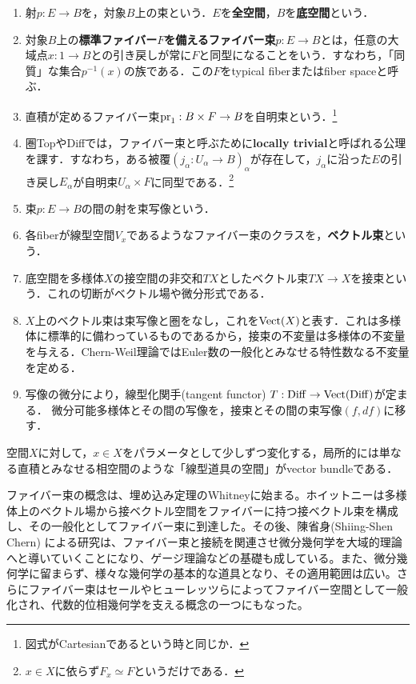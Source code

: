 \documentclass[uplatex,dvipdfmx]{jsreport}
\begin{document}
\begin{definition}\mbox{}
    \begin{enumerate}
        \item 射$p:E\to B$を，対象$B$上の束という．$E$を\textbf{全空間}，$B$を\textbf{底空間}という．
        \item 対象$B$上の\textbf{標準ファイバー$F$を備えるファイバー束}$p:E\to B$とは，任意の大域点$x:1\to B$との引き戻しが常に$F$と同型になることをいう．すなわち，「同質」な集合$p^{-1}(x)$の族である．この$F$をtypical fiberまたはfiber spaceと呼ぶ．
        \item 直積が定めるファイバー束$\mathrm{pr}_1:B\times F\to B$を自明束という．\footnote{図式がCartesianであるという時と同じか．}
        \item 圏TopやDiffでは，ファイバー束と呼ぶために\textbf{locally trivial}と呼ばれる公理を課す．すなわち，ある被覆$(j_\alpha:U_\alpha\to B)_\alpha$が存在して，$j_\alpha$に沿った$E$の引き戻し$E_\alpha$が自明束$U_\alpha\times F$に同型である．\footnote{$x\in X$に依らず$F_x\simeq F$というだけである．}
        \item 束$p:E\to B$の間の射を束写像という．
        \item 各fiberが線型空間$V_x$であるようなファイバー束のクラスを，\textbf{ベクトル束}という．
        \item 底空間を多様体$X$の接空間の非交和$TX$としたベクトル束$TX\to X$を接束という．これの切断がベクトル場や微分形式である．
        \item $X$上のベクトル束は束写像と圏をなし，これを$\mathrm{Vect}(X)$と表す．これは多様体に標準的に備わっているものであるから，接束の不変量は多様体の不変量を与える．Chern-Weil理論ではEuler数の一般化とみなせる特性数なる不変量を定める．
        \item 写像の微分により，線型化関手(tangent functor) $T:\mathrm{Diff}\to\mathrm{Vect}(\mathrm{Diff})$が定まる．
        微分可能多様体とその間の写像を，接束とその間の束写像$(f,df)$に移す．
    \end{enumerate}
\end{definition}
\begin{remarks}
    空間$X$に対して，$x\in X$をパラメータとして少しずつ変化する，局所的には単なる直積とみなせる相空間のような「線型道具の空間」がvector bundleである．
\end{remarks}
\begin{history}[30s生まれの理論]
    ファイバー束の概念は、埋め込み定理のWhitneyに始まる。ホイットニーは多様体上のベクトル場から接ベクトル空間をファイバーに持つ接ベクトル束を構成し、その一般化としてファイバー束に到達した。その後、陳省身(Shiing-Shen Chern) による研究は、ファイバー束と接続を関連させ微分幾何学を大域的理論へと導いていくことになり、ゲージ理論などの基礎も成している。また、微分幾何学に留まらず、様々な幾何学の基本的な道具となり、その適用範囲は広い。さらにファイバー束はセールやヒューレッツらによってファイバー空間として一般化され、代数的位相幾何学を支える概念の一つにもなった。
\end{history}
\end{document}
